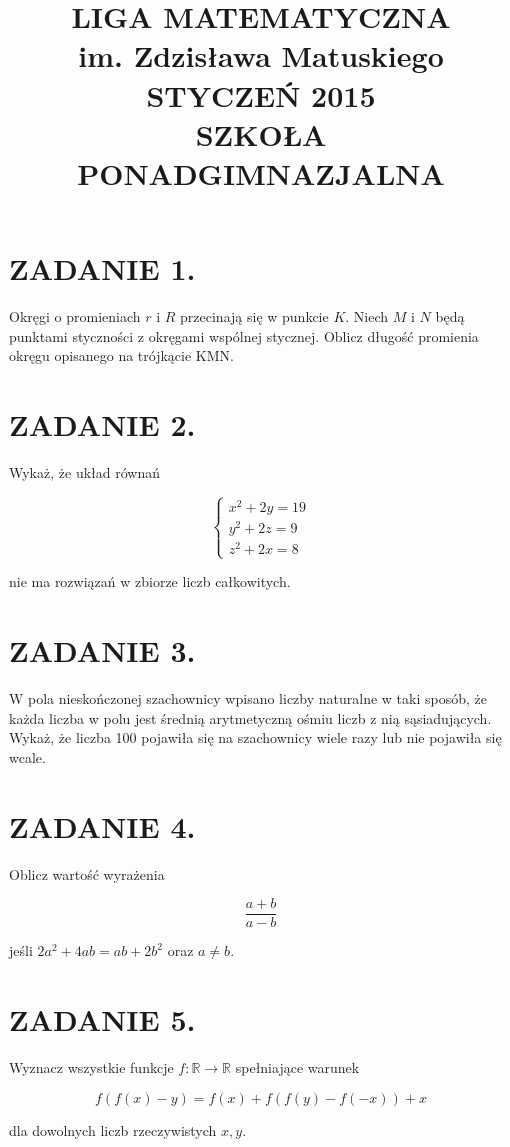 \documentclass[10pt]{article}
\title{LIGA MATEMATYCZNA \\
 im. Zdzisława Matuskiego \\
 STYCZEŃ 2015 \\
 SZKOŁA PONADGIMNAZJALNA }
\author{}
\date{}
\begin{document}
\maketitle
\section*{ZADANIE 1.}
Okręgi o promieniach \(r\) i \(R\) przecinają się w punkcie \(K\). Niech \(M\) i \(N\) będą punktami styczności z okręgami wspólnej stycznej. Oblicz długość promienia okręgu opisanego na trójkącie KMN.

\section*{ZADANIE 2.}
Wykaż, że układ równań

\[
\left\{\begin{array}{l}
x^{2}+2 y=19 \\
y^{2}+2 z=9 \\
z^{2}+2 x=8
\end{array}\right.
\]

nie ma rozwiązań w zbiorze liczb całkowitych.

\section*{ZADANIE 3.}
W pola nieskończonej szachownicy wpisano liczby naturalne w taki sposób, że każda liczba w polu jest średnią arytmetyczną ośmiu liczb z nią sąsiadujących. Wykaż, że liczba 100 pojawiła się na szachownicy wiele razy lub nie pojawiła się wcale.

\section*{ZADANIE 4.}
Oblicz wartość wyrażenia

\[
\frac{a+b}{a-b}
\]

jeśli \(2 a^{2}+4 a b=a b+2 b^{2}\) oraz \(a \neq b\).

\section*{ZADANIE 5.}
Wyznacz wszystkie funkcje \(f: \mathbb{R} \rightarrow \mathbb{R}\) spełniające warunek

\[
f(f(x)-y)=f(x)+f(f(y)-f(-x))+x
\]

dla dowolnych liczb rzeczywistych \(x, y\).
\end{document}
